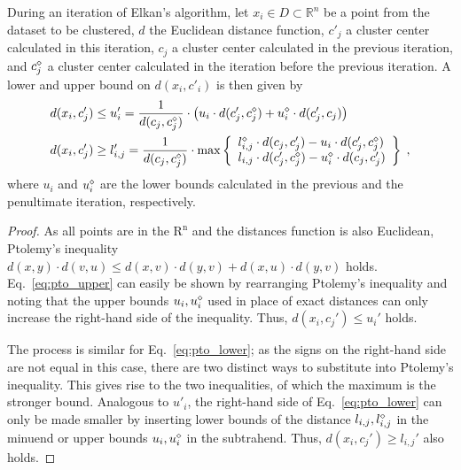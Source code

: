 \begin{theorem}
	During an iteration of Elkan's algorithm,
	let $x_i \in D \subset \mathbb{R}^n$ be a point from the dataset to be clustered,
	$d$ the Euclidean distance function,
	$c'_j$ a cluster center calculated in this iteration,
	$c_j$ a cluster center calculated in the previous iteration, and
	$c^\diamond_j$ a cluster center calculated in the iteration before the previous iteration.
	A lower and upper bound on $d(x_i,c'_i)$ is then given by
	\begin{align}
		\label{eq:pto_upper}
		d(x_i, c_j') & \leq u_i' = \frac{1}{d(c_j, c_j^{\diamond})} \cdot \left( u_i \cdot d(c_j', c_j^{\diamond}) + u_i^{\diamond} \cdot d(c_j', c_j) \right) \\
		\label{eq:pto_lower}
		d(x_i, c_j') & \geq l_{i,j}' = \frac{1}{d(c_j, c_j^{\diamond})} \cdot \max \left\{
		\begin{array}{l}
			l_{i,j}^{\diamond} \cdot d(c_j, c_j') - u_i \cdot d(c_j', c_j^{\diamond}) \\
			l_{i,j} \cdot d(c_j', c_j^{\diamond}) - u_i^{\diamond} \cdot d(c_j, c_j')
		\end{array}
		\right\}\;,
	\end{align}
	where $u_i$ and $u^\diamond_i$ are the lower bounds calculated in the previous and the penultimate iteration, respectively.
\end{theorem}
\begin{proof}
	As all points are in the $\mathrm{R^n}$ and the distances function is also Euclidean, Ptolemy's inequality
	$d(x, y)\cdot d(v, u) \leq d(x, v) \cdot d(y,v) + d(x, u) \cdot d(y, v)$ holds.
	Eq.~\ref{eq:pto_upper} can easily be shown by rearranging Ptolemy's inequality and
	noting that the upper bounds $u_i, u^\diamond_i$ used in place of exact distances can only increase the right-hand side of the inequality. Thus, $d(x_i, c_j') \leq u_i'$ holds.

	The process is similar for Eq.~\ref{eq:pto_lower}; as the signs on the right-hand side are not equal in this case, there are two distinct ways to substitute into Ptolemy's inequality.
	This gives rise to the two inequalities, of which the maximum is the stronger bound.
	Analogous to $u'_i$, the right-hand side of Eq.~\ref{eq:pto_lower} can only be made smaller by inserting lower bounds of the distance $l_{i,j},l_{i,j}^\diamond$ in the minuend or upper bounds $u_i, u^\diamond_i$ in the subtrahend.
	Thus, $d(x_i, c_j') \geq l_{i,j}'$ also holds.
\end{proof}


